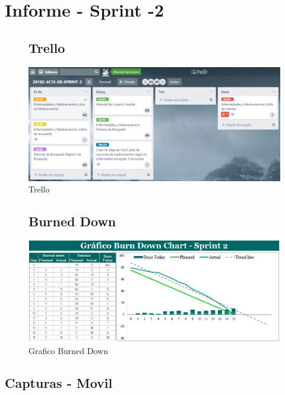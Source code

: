 \chapter{Informe - Sprint -2}
\begin{figure}[H]
\section{Trello}
	\begin{minipage}[b]{\linewidth}
	\centering
	\includegraphics[width=1.20\textwidth]{img/Trello-Sprint2}\par\vspace{2cm}
	\caption{Trello}
	\label{fig:figura1}
	\end{minipage}
	\centering
\end{figure}

\begin{figure}[H]	
\section{Burned Down}
\includegraphics[width=1.20\textwidth]{img/GraficoBurnedDown}\par\vspace{2cm}
\caption{Grafico Burned Down}
\label{fig:figura2}
\end{figure}

\section{Capturas - Movil}

